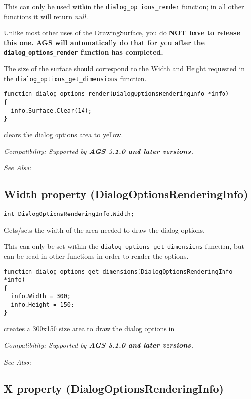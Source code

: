 This can only be used within the \verb$dialog_options_render$ function; in all other
functions it will return \it{null}.

Unlike most other uses of the DrawingSurface, you do \bf{NOT} have to release this one.
AGS will automatically do that for you after the \verb$dialog_options_render$ function
has completed.

The size of the surface should correspond to the Width and Height requested in
the \verb$dialog_options_get_dimensions$ function.

\begin{verbatim}
function dialog_options_render(DialogOptionsRenderingInfo *info)
{
  info.Surface.Clear(14);
}
\end{verbatim}
clears the dialog options area to yellow.

\it{Compatibility:} Supported by \bf{AGS 3.1.0} and later versions.

\it{See Also:} 


\subsection{Width property (DialogOptionsRenderingInfo)}\label{DialogOptionsRenderingInfo.Width}%

\begin{verbatim}
int DialogOptionsRenderingInfo.Width;
\end{verbatim}
Gets/sets the width of the area needed to draw the dialog options.

This can only be set within the \verb$dialog_options_get_dimensions$ function, but
can be read in other functions in order to render the options.

\begin{verbatim}
function dialog_options_get_dimensions(DialogOptionsRenderingInfo *info)
{
  info.Width = 300;
  info.Height = 150;
}
\end{verbatim}
creates a 300x150 size area to draw the dialog options in

\it{Compatibility:} Supported by \bf{AGS 3.1.0} and later versions.

\it{See Also:} 


\subsection{X property (DialogOptionsRenderingInfo)}\label{DialogOptionsRenderingInfo.X}%

